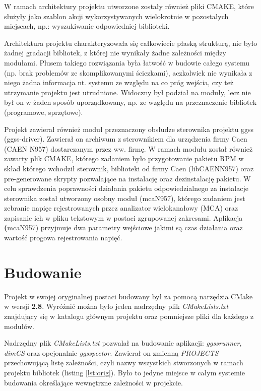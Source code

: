 W ramach architektury projektu utworzone zostały również pliki CMAKE, które służyły jako szablon akcji wykorzystywanych wielokrotnie w pozostałych miejscach, np.: wyszukiwanie odpowiedniej biblioteki.\par 
Architektura projektu charakteryzowała się całkowiecie płaską strukturą, nie było żadnej gradacji bibliotek, z której nie wynikały żadne zależności między modułami. Plusem takiego rozwiązania była łatwość w budowie całego systemu (np. brak problemów ze skomplikowanymi ściezkami), aczkolwiek nie wynikała z niego żadna informacja nt. systemu ze względu na co próg wejścia, czy też utrzymanie projektu jest utrudnione. Widoczny był podział na moduły, lecz nie był on w żaden sposób uporządkowany, np. ze względu na przeznaczenie bibliotek (programowe, sprzętowe). 

\par Projekt zawierał również moduł przeznaczony obsłudze sterownika projektu ggss (ggss-driver). Zawierał on archiwum z sterownikiem dla urządzenia firmy Caen (CAEN N957) dostarczanym przez ww. firmę. W ramach modułu został również zawarty plik CMAKE, którego zadaniem było przygotowanie pakietu RPM w skład którego wchodził sterownik, biblioteki od firmy Caen (libCAENN957) oraz pre-generowane skrypty pozwalające na instalację oraz dezinstalację pakietu. W celu sprawdzenia poprawności działania pakietu odpowiedzialnego za instalacje sterownika został utworzony osobny moduł (mcaN957), którego zadaniem jest zebranie napięc rejestrowanych przez analizator wielokanałowy (MCA) oraz zapisanie ich w pliku tekstowym w postaci zgrupowanej zakresami. Aplikacja \textbf(mcaN957) przyjmuje dwa parametry wejściowe jakimi są czas działania oraz wartość progowa rejestrowania napięć.



\section{Budowanie} 
Projekt w swojej oryginalnej postaci budowany był za pomocą narzędzia CMake w wersji \textbf{2.8}. Wyróżnić można było jeden nadrzędny plik \textit{CMakeLists.txt} znajdujący się w katalogu głównym projektu oraz pomniejsze pliki dla każdego z modułów.

Nadrzędny plik \textit{CMakeLists.txt} pozwalał na budowanie aplikacji: \textit{ggssrunner}, \textit{dimCS} oraz opcjonalnie \textit{ggsspector}. Zawierał on zmienną \textit{PROJECTS} przechowującą listę zależności, czyli nazwy wszystkich stworzonych w ramach projektu bibliotek (listing \ref{lst:orig}). Było to jedyne miejsce w całym systemie budowania określające wewnętrzne zależności w projekcie.


